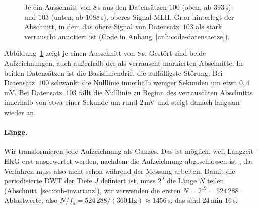 \documentclass[a4paper,11pt,bibliography=totoc,listof=totoc,headinclude=true,cleardoublepage=empty,oneside]{scrbook}
\theoremstyle{plain}
\theoremstyle{definition}
\begin{document}
\begin{figure}[htbp]
  \centering
  \caption[Ausschnitte aus den Datensätzen 100 und 103]{Je ein Ausschnitt von
  $8$\,s aus den Datensätzen $100$ (oben, ab $393$\,s) und $103$ (unten, ab
  $1088$\,s), oberes Signal MLII. Grau hinterlegt der Abschnitt, in dem das
  obere Signal von Datensatz~$103$ als stark verrauscht annotiert ist (Code in
  Anhang~\ref{anh:code-datensaetze}).}
  \label{fig:datensaetze}
\end{figure}

Abbildung~\ref{fig:datensaetze} zeigt je einen Ausschnitt von $8$\,s.
Gestört sind beide Aufzeichnungen, auch au\ss erhalb der als verrauscht
markierten Abschnitte. In beiden Datensätzen ist die Basisliniendrift die
auffälligste Störung. Bei Datensatz~$100$ schwankt die Nulllinie innerhalb
weniger Sekunden um etwa $0{,}4$\,mV. Bei Datensatz~$103$ fällt die Nulllinie
zu Beginn des verrauschten Abschnitts innerhalb von etwa einer Sekunde um rund
$2$\,mV und steigt danach langsam wieder an.

\paragraph{Länge.}
Wir transformieren jede Aufzeichnung als Ganzes. Das ist möglich, weil
Langzeit-EKG erst ausgewertet werden, nachdem die Aufzeichnung abgeschlossen
ist \cite[Kap.~6.6.3]{sornmo}, %
das Verfahren muss also nicht schon während der Messung arbeiten. Damit die
periodisierte DWT der Tiefe $J$ definiert ist, muss $2^J$ die Länge $N$
teilen (Abschnitt~\ref{sec:onb-invarianz}), wir verwenden die ersten
$N = 2^{19} = 524\,288$ Abtastwerte, also
$N/f_s = 524\,288/(360\,\mathrm{Hz}) \approx 1456\,\mathrm{s}$, das sind
$24$\,min $16$\,s.
\end{document}
